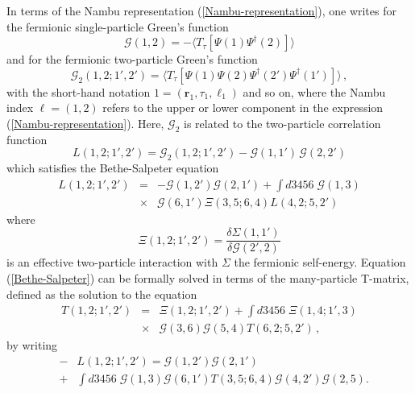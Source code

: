 \documentclass[pra,twocolumn,aps,amssymb,showpacs,superscriptaddress]{revtex4-1}
\begin{document}
In terms of the Nambu representation (\ref{Nambu-representation}), one writes for the fermionic single-particle Green's function
\begin{equation}
{\mathcal G}(1,2)  =  -  \langle T_{\tau}[\Psi(1) \Psi^{\dagger}(2)] \rangle
\label{G-1}
\end{equation}
and for the fermionic two-particle Green's function
\begin{equation}
{\mathcal G}_{2}(1,2;1',2')  =  \langle T_{\tau}[\Psi(1) \Psi(2) \Psi^{\dagger}(2') \Psi^{\dagger}(1')] \rangle \, ,
\label{G-2}
\end{equation}
with the short-hand notation $1=({\mathbf r}_{1}, \tau_{1}, \ell_{1})$ and so on, where the Nambu index $\ell=(1,2)$ refers to the upper or lower component in the expression (\ref{Nambu-representation}). 
Here, ${\mathcal G}_{2}$ is related to the two-particle correlation function
\begin{equation}
L(1,2;1',2')  = {\mathcal G}_{2}(1,2;1',2') - {\mathcal G}(1,1') \, {\mathcal G}(2,2')
\label{L}
\end{equation}
which satisfies the Bethe-Salpeter equation \cite{Andrenacci-2003,Baym-1962,Strinati-RNC}
\begin{eqnarray}
L(1,2;1',2') & = & - {\mathcal G}(1,2') {\mathcal G}(2,1') +  \int \!d3456 \; {\mathcal G}(1,3)
\nonumber   \\
& \times & {\mathcal G}(6,1')  \Xi(3,5;6,4) L(4,2;5,2')
\label{Bethe-Salpeter}
\end{eqnarray}
where
\begin{equation}
\Xi(1,2;1',2')  =  \frac{\delta \Sigma(1,1')}{\delta {\mathcal G}(2',2)}
\label{2-p-int}
\end{equation}
is an effective two-particle interaction with $\Sigma$ the fermionic self-energy.
Equation (\ref{Bethe-Salpeter}) can be formally solved in terms of the many-particle T-matrix, defined as the solution to the equation \cite{Andrenacci-2003,Baym-1962,Strinati-RNC}
\begin{eqnarray}
T(1,2;1',2') & = & \Xi(1,2;1',2') + \int \!d3456 \; \Xi(1,4;1',3)
\nonumber   \\
& \times & {\mathcal G}(3,6) {\mathcal G}(5,4)  T(6,2;5,2') \, ,
\label{many-p-T-matrix}
\end{eqnarray}
by writing
\begin{eqnarray}
& -  & L(1,2;1',2') = {\mathcal G}(1,2')  {\mathcal G}(2,1')
\label{L-T} \\
& + & \int d3456 \; {\mathcal G}(1,3) {\mathcal G}(6,1')  T(3,5;6,4) {\mathcal G}(4,2')  {\mathcal G}(2,5) .
\nonumber 
\end{eqnarray}
\end{document}
